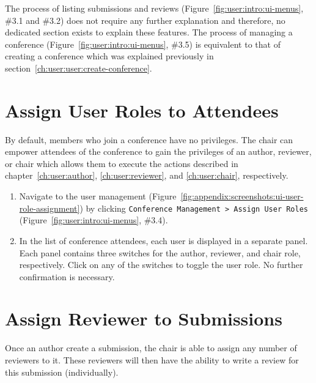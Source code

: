 \documentclass[nochapterpage,nopartpage,noheadingspace,numbersubsubsec,bigchapter,colorback,accentcolor=tud9c,10pt]{tudreport}
\begin{document}
    The process of listing submissions and reviews (Figure~\ref{fig:user:intro:ui-menus}, \#3.1 and \#3.2) does not require any further explanation and therefore, no dedicated section exists to explain these features. The process of managing a conference (Figure~\ref{fig:user:intro:ui-menus}, \#3.5) is equivalent to that of creating a conference which was explained previously in section~\ref{ch:user:user:create-conference}.

  \section{Assign User Roles to Attendees}
  \label{ch:user:chair:assign-roles}

    By default, members who join a conference have no privileges. The chair can empower attendees of the conference to gain the privileges of an author, reviewer, or chair which allows them to execute the actions described in chapter~\ref{ch:user:author}, \ref{ch:user:reviewer}, and \ref{ch:user:chair}, respectively.

        \begin{enumerate}
            \setlength\itemsep{0em}
            \item Navigate to the user management (Figure~\ref{fig:appendix:screenshots:ui-user-role-assignment}) by clicking \texttt{Conference Management > Assign User Roles} (Figure~\ref{fig:user:intro:ui-menus}, \#3.4).
            \item In the list of conference attendees, each user is displayed in a separate panel. Each panel contains three switches for the author, reviewer, and chair role, respectively. Click on any of the switches to toggle the user role. No further confirmation is necessary.
        \end{enumerate}

  \section{Assign Reviewer to Submissions}
  \label{ch:user:chair:assign-reviewer}

    Once an author create a submission, the chair is able to assign any number of reviewers to it. These reviewers will then have the ability to write a review for this submission (individually).
\end{document}
